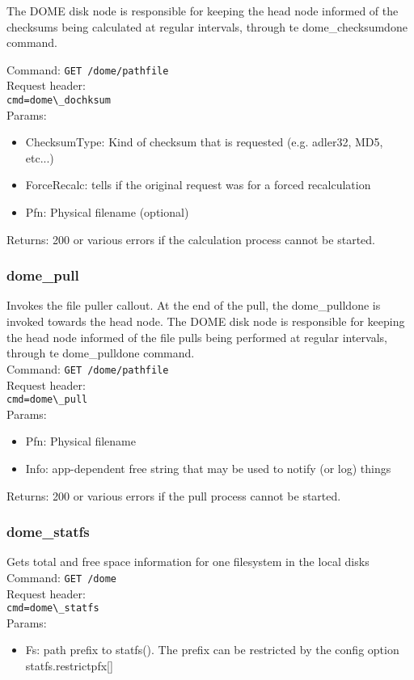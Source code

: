 \documentclass[a4paper,10pt]{scrreprt}
\begin{document}
 The DOME disk node is responsible for keeping the head node
 informed of the checksums being calculated at regular intervals,
 through te dome\_checksumdone command.

 Command:
\lstinline"GET /dome/pathfile"\\
Request header:\\
\lstinline"cmd=dome\_dochksum"\\
Params:
\begin{itemize}
 \item ChecksumType: Kind of checksum that is requested (e.g. adler32, MD5, etc...)
 \item ForceRecalc: tells if the original request was for a forced recalculation
 \item Pfn: Physical filename (optional)
\end{itemize}

Returns: 200 or various errors if the calculation process cannot be started.


\subsubsection{dome\_pull}
 Invokes the file puller callout. At the end of the pull, the dome\_pulldone is invoked towards the head node.
 The DOME disk node is responsible for keeping the head node
 informed of the file pulls being performed at regular intervals,
 through te dome\_pulldone command.\\
 
 
 
Command:
\lstinline"GET /dome/pathfile"\\
Request header:\\
\lstinline"cmd=dome\_pull"\\
Params:
\begin{itemize}
 \item Pfn: Physical filename
 \item Info: app-dependent free string that may be used to notify (or log) things
\end{itemize}

Returns: 200 or various errors if the pull process cannot be started.

\subsubsection{dome\_statfs}

Gets total and free space information for one filesystem in the local disks\\
Command:
\lstinline"GET /dome"\\
Request header:\\
\lstinline"cmd=dome\_statfs"\\
Params:
\begin{itemize}
 \item Fs: path prefix to statfs(). The prefix can be restricted by the config option statfs.restrictpfx[]
\end{itemize}
\end{document}
